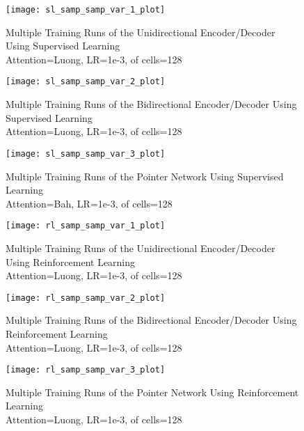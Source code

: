 \documentclass[12pt]{article}
\begin{document}
\begin{figure}[H]
  \centering
  \captionsetup{justification=centering}
  \texttt{[image: sl\_samp\_samp\_var\_1\_plot]}
  \caption{Multiple Training Runs of the Unidirectional Encoder/Decoder Using Supervised Learning\\ Attention=Luong, LR=1e-3,  of cells=128}
  \label{fig_sl_samp_var_1}
\end{figure}

\begin{figure}[H]
  \centering
  \captionsetup{justification=centering}
  \texttt{[image: sl\_samp\_samp\_var\_2\_plot]}
  \caption{Multiple Training Runs of the Bidirectional Encoder/Decoder Using Supervised Learning\\ Attention=Luong, LR=1e-3,  of cells=128}
  \label{fig_sl_samp_var_2}
\end{figure}

\begin{figure}[H]
  \centering
  \captionsetup{justification=centering}
  \texttt{[image: sl\_samp\_samp\_var\_3\_plot]}
  \caption{Multiple Training Runs of the Pointer Network Using Supervised Learning\\ Attention=Bah, LR=1e-3,  of cells=128}
  \label{fig_sl_samp_var_3}
\end{figure}

\begin{figure}[H]
  \centering
  \captionsetup{justification=centering}
  \texttt{[image: rl\_samp\_samp\_var\_1\_plot]}
  \caption{Multiple Training Runs of the Unidirectional Encoder/Decoder Using Reinforcement Learning\\ Attention=Luong, LR=1e-3,  of cells=128}
  \label{fig_rl_samp_var_1}
\end{figure}

\begin{figure}[H]
  \centering
  \captionsetup{justification=centering}
  \texttt{[image: rl\_samp\_samp\_var\_2\_plot]}
  \caption{Multiple Training Runs of the Bidirectional Encoder/Decoder Using Reinforcement Learning\\ Attention=Luong, LR=1e-3,  of cells=128}
  \label{fig_rl_samp_var_2}
\end{figure}

\begin{figure}[H]
  \centering
  \captionsetup{justification=centering}
  \texttt{[image: rl\_samp\_samp\_var\_3\_plot]}
  \caption{Multiple Training Runs of the Pointer Network Using Reinforcement Learning\\ Attention=Luong, LR=1e-3,  of cells=128}
  \label{fig_rl_samp_var_3}
\end{figure}
\end{document}
